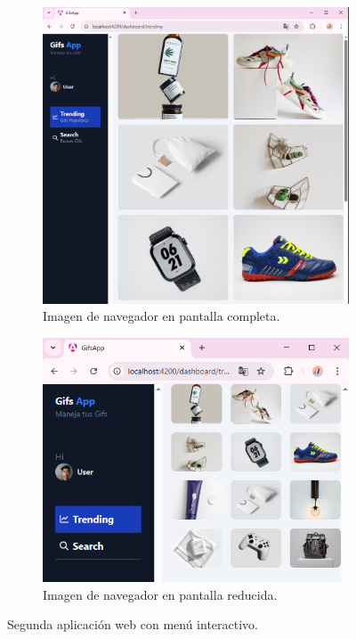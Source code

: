 \begin{figure}[H]
\centering
\begin{subfigure}[b]{0.55\textwidth}
\centering
\includegraphics[width=\textwidth]{figuras/foto1.png}
\caption{Imagen de navegador en pantalla completa.}
\label{foto1}
\end{subfigure}
\hfill
\begin{subfigure}[b]{0.55\textwidth}
\centering
\includegraphics[width=\textwidth]{figuras/foto2.png}
\caption{Imagen de navegador en pantalla reducida.}
\label{foto2}
\end{subfigure}
\caption{Segunda aplicación web con menú interactivo.}
\label{fotomenu}
\end{figure}

